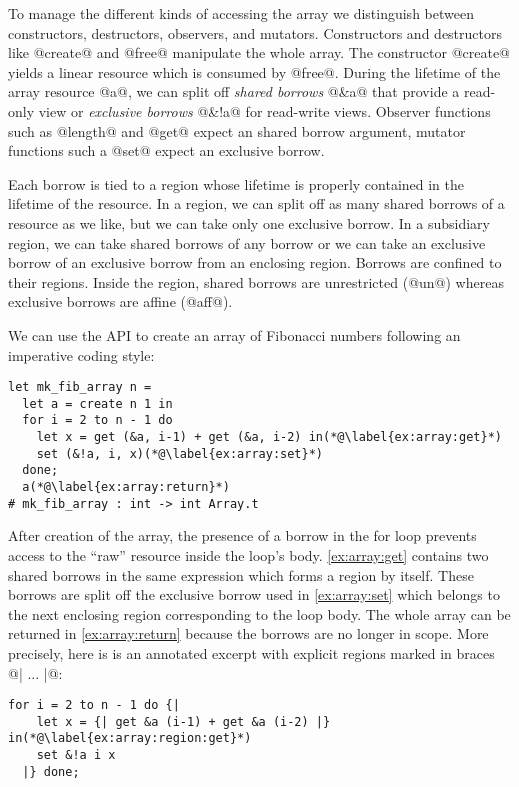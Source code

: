 To manage the different kinds of accessing the array we distinguish between constructors, destructors,
observers, and mutators.
Constructors and destructors like @create@ and @free@ manipulate the whole
array. %
The constructor
@create@ yields a linear resource which is consumed by @free@.
During the lifetime of the array resource @a@, we can split
off \emph{shared borrows} @&a@ that provide a read-only
view or \emph{exclusive borrows} @&!a@ for read-write views.
Observer functions such as @length@ and @get@ expect an shared borrow
argument, mutator functions such a @set@ expect
an exclusive borrow.

Each borrow is tied to a region whose lifetime is properly
contained in the lifetime of the resource.
In a region, we can split off as many shared borrows of a resource as
we like, but we can take only one exclusive borrow. In a
subsidiary region, we can take shared borrows of any
borrow or we can take an exclusive borrow of an exclusive borrow from an
enclosing region. Borrows are confined to their regions. Inside the region,
shared borrows are unrestricted (@un@) whereas exclusive
borrows are affine (@aff@).

We can use the API 
to create an
array of Fibonacci numbers following an imperative coding style:
\begin{lstlisting}
let mk_fib_array n =
  let a = create n 1 in
  for i = 2 to n - 1 do
    let x = get (&a, i-1) + get (&a, i-2) in(*@\label{ex:array:get}*)
    set (&!a, i, x)(*@\label{ex:array:set}*)
  done;
  a(*@\label{ex:array:return}*)
# mk_fib_array : int -> int Array.t
\end{lstlisting}

After
creation of the array, the presence of a borrow in the for loop
prevents access to the ``raw'' resource inside the loop's
body. \cref{ex:array:get} contains two shared borrows
in the same expression which forms a region by itself. These borrows
are split off the exclusive borrow used in \cref{ex:array:set} which
belongs to the next enclosing region corresponding to the loop body.
The whole array can be returned in \cref{ex:array:return} because  the
borrows are no longer in scope.
%
More precisely, here is is an annotated excerpt with explicit regions
marked in braces @{| ... |}@:
\begin{lstlisting}[firstnumber=3]
  for i = 2 to n - 1 do {|
    let x = {| get &a (i-1) + get &a (i-2) |} in(*@\label{ex:array:region:get}*)
    set &!a i x
  |} done;
\end{lstlisting}


